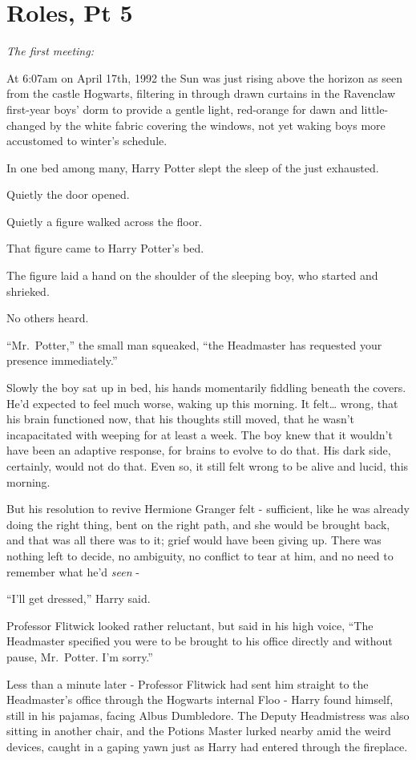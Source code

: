 \chapter{Roles, Pt 5}

\emph{The first meeting:}

At 6:07am on April 17th, 1992 the Sun was just rising above the horizon
as seen from the castle Hogwarts, filtering in through drawn curtains in
the Ravenclaw first-year boys' dorm to provide a gentle light,
red-orange for dawn and little-changed by the white fabric covering the
windows, not yet waking boys more accustomed to winter's schedule.

In one bed among many, Harry Potter slept the sleep of the just
exhausted.

Quietly the door opened.

Quietly a figure walked across the floor.

That figure came to Harry Potter's bed.

The figure laid a hand on the shoulder of the sleeping boy, who started
and shrieked.

No others heard.

``Mr.~Potter,'' the small man squeaked, ``the Headmaster has requested
your presence immediately.''

Slowly the boy sat up in bed, his hands momentarily fiddling beneath the
covers. He'd expected to feel much worse, waking up this morning. It
felt\ldots{} wrong, that his brain functioned now, that his thoughts
still moved, that he wasn't incapacitated with weeping for at least a
week. The boy knew that it wouldn't have been an adaptive response, for
brains to evolve to do that. His dark side, certainly, would not do
that. Even so, it still felt wrong to be alive and lucid, this morning.

But his resolution to revive Hermione Granger felt - sufficient, like he
was already doing the right thing, bent on the right path, and she would
be brought back, and that was all there was to it; grief would have been
giving up. There was nothing left to decide, no ambiguity, no conflict
to tear at him, and no need to remember what he'd \emph{seen} -

``I'll get dressed,'' Harry said.

Professor Flitwick looked rather reluctant, but said in his high voice,
``The Headmaster specified you were to be brought to his office directly
and without pause, Mr.~Potter. I'm sorry.''

Less than a minute later - Professor Flitwick had sent him straight to
the Headmaster's office through the Hogwarts internal Floo - Harry found
himself, still in his pajamas, facing Albus Dumbledore. The Deputy
Headmistress was also sitting in another chair, and the Potions Master
lurked nearby amid the weird devices, caught in a gaping yawn just as
Harry had entered through the fireplace.

